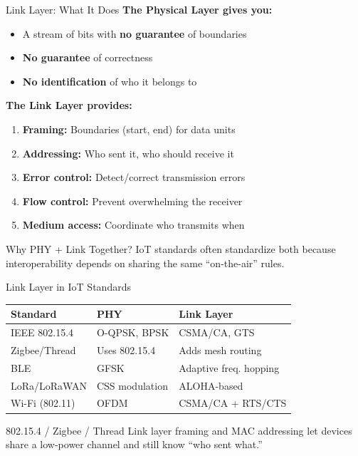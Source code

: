 \documentclass[aspectratio=169,11pt]{beamer}
\begin{document}
\begin{frame}{Link Layer: What It Does}
    \textbf{The Physical Layer gives you:}
    \begin{itemize}
        \item A stream of bits with \textbf{no guarantee} of boundaries
        \item \textbf{No guarantee} of correctness
        \item \textbf{No identification} of who it belongs to
    \end{itemize}
    
    \vspace{0.3cm}
    \textbf{The Link Layer provides:}
    \begin{enumerate}
        \item \textbf{Framing:} Boundaries (start, end) for data units
        \item \textbf{Addressing:} Who sent it, who should receive it
        \item \textbf{Error control:} Detect/correct transmission errors
        \item \textbf{Flow control:} Prevent overwhelming the receiver
        \item \textbf{Medium access:} Coordinate who transmits when
    \end{enumerate}
    
    \begin{block}{Why PHY + Link Together?}
        IoT standards often standardize both because interoperability depends on sharing the same ``on-the-air'' rules.
    \end{block}
\end{frame}

\begin{frame}{Link Layer in IoT Standards}
    \begin{table}
        \centering
        \begin{tabular}{@{}lll@{}}
            \toprule
            \textbf{Standard} & \textbf{PHY} & \textbf{Link Layer} \\
            \midrule
            IEEE 802.15.4 & O-QPSK, BPSK & CSMA/CA, GTS \\
            Zigbee/Thread & Uses 802.15.4 & Adds mesh routing \\
            BLE & GFSK & Adaptive freq. hopping \\
            LoRa/LoRaWAN & CSS modulation & ALOHA-based \\
            Wi-Fi (802.11) & OFDM & CSMA/CA + RTS/CTS \\
            \bottomrule
        \end{tabular}
    \end{table}
    
    \begin{exampleblock}{802.15.4 / Zigbee / Thread}
        Link layer framing and MAC addressing let devices share a low-power channel and still know ``who sent what.''
    \end{exampleblock}
\end{frame}
\end{document}

